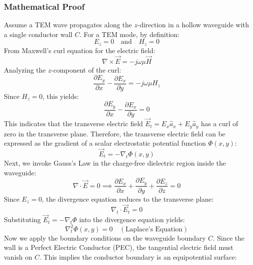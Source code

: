 \documentclass[12pt,a4paper]{article}
\begin{document}
\subsubsection{Mathematical Proof}
Assume a TEM wave propagates along the $z$-direction in a hollow waveguide with a single conductor wall $C$. For a TEM mode, by definition:
\begin{equation*}
  E_z = 0 \quad \text{and} \quad H_z = 0
\end{equation*}
From Maxwell's curl equation for the electric field:
\begin{equation*}
  \nabla \times \vec{E} = -j\omega\mu \vec{H}
\end{equation*}
Analyzing the $z$-component of the curl:
\begin{equation}
  \frac{\partial E_y}{\partial x} - \frac{\partial E_x}{\partial y} = -j\omega\mu H_z
\end{equation}
Since $H_z = 0$, this yields:
\begin{equation}
  \frac{\partial E_y}{\partial x} - \frac{\partial E_x}{\partial y} = 0
\end{equation}
This indicates that the transverse electric field $\vec{E}_t = E_x \hat{a}_x + E_y \hat{a}_y$ has a curl of zero in the transverse plane. Therefore, the transverse electric field can be expressed as the gradient of a scalar electrostatic potential function $\Phi(x, y)$:
\begin{equation}
  \vec{E}_t = -\nabla_t \Phi(x, y)
\end{equation}
Next, we invoke Gauss's Law in the charge-free dielectric region inside the waveguide:
\begin{equation*}
  \nabla \cdot \vec{E} = 0 \implies \frac{\partial E_x}{\partial x} + \frac{\partial E_y}{\partial y} + \frac{\partial E_z}{\partial z} = 0
\end{equation*}
Since $E_z = 0$, the divergence equation reduces to the transverse plane:
\begin{equation}
  \nabla_t \cdot \vec{E}_t = 0
\end{equation}
Substituting $\vec{E}_t = -\nabla_t \Phi$ into the divergence equation yields:
\begin{equation}
  \nabla_t^2 \Phi(x, y) = 0 \quad (\text{Laplace's Equation})
\end{equation}
Now we apply the boundary conditions on the waveguide boundary $C$. Since the wall is a Perfect Electric Conductor (PEC), the tangential electric field must vanish on $C$.
This implies the conductor boundary is an equipotential surface:
\end{document}
